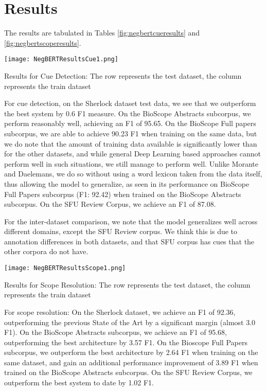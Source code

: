 \documentclass[10pt, a4paper]{article}
\begin{document}
\section{Results}
The results are tabulated in Tables \ref{fig:negbertcueresults} and \ref{fig:negbertscoperesults}.

\begin{table}[h]
    \centering
    \texttt{[image: NegBERTResultsCue1.png]}
    \caption{Results for Cue Detection: The row represents the test dataset, the column represents the train dataset}
    \label{fig:negbertcueresults}
\end{table}

\par For cue detection, on the Sherlock dataset test data, we see that we outperform the best system \cite{chowdhury-2012-fbk} by 0.6 F1 measure. On the BioScope Abstracts subcorpus, we perform reasonably well, achieving an F1 of 95.65. On the BioScope Full papers subcorpus, we are able to achieve 90.23 F1 when training on the same data, but we do note that the amount of training data available is significantly lower than for the other datasets, and while general Deep Learning based approaches cannot perform well in such situations, we still manage to perform well. Unlike Morante and Daelemans, we do so without using a word lexicon taken from the data itself, thus allowing the model to generalize, as seen in its performance on BioScope Full Papers subcorpus (F1: 92.42) when trained on the BioScope Abstracts subcorpus. On the SFU Review Corpus, we achieve an F1 of 87.08.
\par For the inter-dataset comparison, we note that the model generalizes well across different domains, except the SFU Review corpus. We think this is due to annotation differences in both datasets, and that SFU corpus has cues that the other corpora do not have.

\begin{table}[h]
    \centering
    \texttt{[image: NegBERTResultsScope1.png]}
    \caption{Results for Scope Resolution: The row represents the test dataset, the column represents the train dataset}
    \label{fig:negbertscoperesults}
\end{table}

\par For scope resolution: On the Sherlock dataset, we achieve an F1 of 92.36, outperforming the previous State of the Art by a significant margin (almost 3.0 F1). On the BioScope Abstracts subcorpus, we achieve an F1 of 95.68, outperforming the best architecture by 3.57 F1. On the Bioscope Full Papers subcorpus, we outperform the best architecture by 2.64 F1 when training on the same dataset, and gain an additional performance improvement of 3.89 F1 when trained on the BioScope Abstracts subcorpus. On the SFU Review Corpus, we outperform the best system to date by 1.02 F1.
\end{document}

